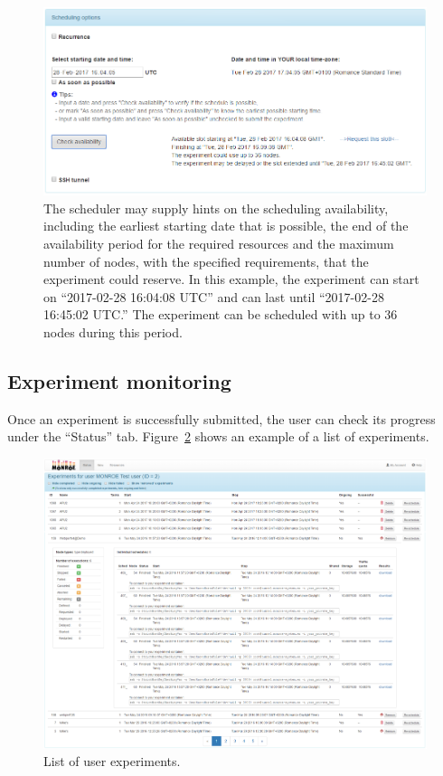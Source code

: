 \documentclass[a4paper,10pt]{article}
\begin{document}
\begin{figure}[tp]
	\centering
	\includegraphics[width=1.0\textwidth]{NewExperimentCheckAvailability.png}
	\caption{The scheduler may supply hints on the scheduling availability, including the earliest starting date that is possible, the end of the availability period for the required resources and the maximum number of nodes, with the specified requirements, that the experiment could reserve. In this example, the experiment can start on ``2017-02-28 16:04:08 UTC'' and can last until ``2017-02-28 16:45:02 UTC.'' The experiment can be scheduled with up to 36 nodes during this period.}
	\label{fig:newExperimentCheckAvailability}
\end{figure}


\subsection{Experiment monitoring}
\label{subsec:experimentMonitoring}

Once an experiment is successfully submitted, the user can check its progress under the ``Status'' tab.
Figure~\ref{fig:ExperimentsSummary} shows an example of a list of experiments.

\begin{figure}[tp]
	\centering
	\includegraphics[width=1.0\textwidth]{ExperimentSummary.png}
	\caption{List of user experiments.}
	\label{fig:ExperimentsSummary}
\end{figure}
\end{document}
